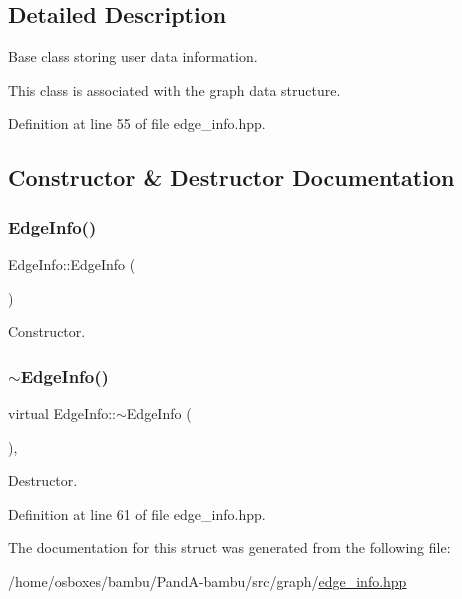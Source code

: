 \subsection{Detailed Description}
Base class storing user data information. 

This class is associated with the graph data structure. 

Definition at line 55 of file edge\+\_\+info.\+hpp.



\subsection{Constructor \& Destructor Documentation}
\mbox{\label{structEdgeInfo_a323c9099eb1dfd8d9679d546935b97c5}} 
\subsubsection{\texorpdfstring{Edge\+Info()}{EdgeInfo()}}
{\footnotesize\ttfamily Edge\+Info\+::\+Edge\+Info (\begin{DoxyParamCaption}{ }\end{DoxyParamCaption})\hspace{0.3cm}{\ttfamily [default]}}



Constructor. 

\mbox{\label{structEdgeInfo_a7266191cf036c114b90edc7dee9b2348}} 
\subsubsection{\texorpdfstring{$\sim$\+Edge\+Info()}{~EdgeInfo()}}
{\footnotesize\ttfamily virtual Edge\+Info\+::$\sim$\+Edge\+Info (\begin{DoxyParamCaption}{ }\end{DoxyParamCaption})\hspace{0.3cm}{\ttfamily [inline]}, {\ttfamily [virtual]}}



Destructor. 



Definition at line 61 of file edge\+\_\+info.\+hpp.



The documentation for this struct was generated from the following file\+:\begin{DoxyCompactItemize}
\item 
/home/osboxes/bambu/\+Pand\+A-\/bambu/src/graph/\hyperlink{edge__info_8hpp}{edge\+\_\+info.\+hpp}\end{DoxyCompactItemize}

